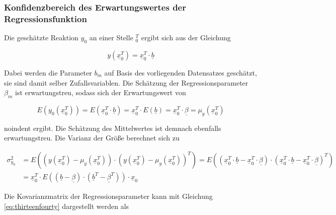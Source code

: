 \subsubsection{Konfidenzbereich des Erwartungswertes der Regressionsfunktion}

\noindent Die gesch\"{a}tzte Reaktion $y_{0}$ an einer Stelle $_{0}^{T}$ ergibt sich aus der Gleichung 

\begin{equation}\label{eq:thirteenfiftyeight}
y(\underline{x}_{0}^{T})=\underline{x}_{0}^{T} \cdot \underline{b}
\end{equation}

\noindent Dabei werden die Parameter $b_{m}$ auf Basis des vorliegenden Datensatzes gesch\"{a}tzt, sie sind damit selber Zufallsvariablen. Die Sch\"{a}tzung der Regressionsparameter $\beta_{m}$ ist erwartungstreu, sodass sich der Erwartungswert von 

\begin{equation}\label{eq:thirteenfiftynine}
E\left(y_{0} \left(\underline{x}_{0}^{T} \right)\right)=E\left(\underline{x}_{0}^{T} \cdot \underline{b}\right)=\underline{x}_{0}^{T} \cdot E\left(\underline{b}\right)=\underline{x}_{0}^{T} \cdot \underline{\beta }=\mu _{y} \left(\underline{x}_{0}^{T} \right)
\end{equation}

noindent ergibt. Die Sch\"{a}tzung des Mittelwertes ist demnach ebenfalls erwartungstreu. Die Varianz der Gr\"{o}{\ss}e berechnet sich zu

\begin{equation}\label{eq:thirteensixty}
\begin{split}
\sigma _{y_{0} }^{2} & = E\left(\left(y\left(\underline{x}_{0}^{T} \right)-\mu _{y} \left(\underline{x}_{0}^{T} \right)\right)\cdot \left(y\left(\underline{x}_{0}^{T} \right)-\mu _{y} \left(\underline{x}_{0}^{T} \right)\right)^{T} \right)=E\left(\left(\underline{x}_{0}^{T} \cdot \underline{b}-\underline{x}_{0}^{T} \cdot \underline{\beta }\right)\cdot \left(\underline{x}_{0}^{T} \cdot \underline{b}-\underline{x}_{0}^{T} \cdot \underline{\beta }\right)^{T} \right)\\ 
& = \underline{x}_{0}^{T} \cdot E\left(\left(\underline{b}-\underline{\beta }\right)\cdot \left(\underline{b}^{T} -\underline{\beta }^{T} \right)\right)\cdot \underline{x}_{0}
\end{split}
\end{equation}

\noindent Die Kovarianzmatrix der Regressionsparameter kann mit Gleichung \eqref{eq:thirteenfourty} dargestellt werden als 

